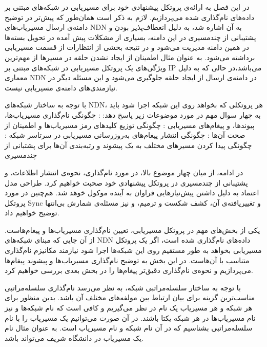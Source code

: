 

در این فصل به ارائه‌ی پروتکل پیشنهادی خود برای مسیریابی در شبکه‌های مبتنی بر داده‌های نام‌گذاری شده می‌پردازیم. لازم به ذکر است همان‌طور که پیش‌تر در توضیح دامنه‌ی ارسال مسیریاب‌های NDN به آن اشاره شد، به دلیل انعطاف‌پذیر بودن و پشتیبانی از چندمسیری در این دامنه‌، بسیاری از مشکلات پیش آمده در تحویل بسته‌ها در همین دامنه مدیریت می‌شود و در نتیجه بخشی از انتظارات از قسمت مسیریابی برداشته می‌شود. به عنوان مثال اطمینان از ایجاد نشدن حلقه در مسیرها از مهم‌ترین ویژگی‌های یک پروتکل مسیریابی در شبکه‌های مبتنی بر IP می‌باشد،در حالی که به دلیل معماری NDN در دامنه‌ی ارسال از ایجاد حلقه جلوگیری می‌شود و این مسئله دیگر در نیازمندی‌های دامنه‌ی مسیریابی نیست. 

 با توجه به ساختار شبکه‌های NDN، هر پروتکلی که بخواهد روی این شبکه اجرا شود باید به چهار سوال مهم در مورد موضوعات زیر پاسخ دهد:
 : چگونگی نام‌گذاری مسیریاب‌ها، پیوند‌ها، و پیغام‌های مسیریابی
 : چگونگی توزیع کلید‌های رمز مسیریاب‌ها و اطمینان از صحت آن‌ها
 : چگونگی انتشار پیغام‌های به‌روزرسانی مسیریابی در سرتاسر شبکه
 : چگونگی پیدا کردن مسیرهای مختلف به یک پیشوند و رتبه‌بندی آن‌ها برای پشتبانی از چندمسیری

در ادامه، از میان چهار موضوع بالا، در مورد نام‌گذاری، نحوه‌ی انتشار اطلاعات، و پشتیبانی از چندمسیری در پروتکل پیشنهادی خود صحبت خواهیم کرد. طراحی مدل اعتماد به دلیل داشتن  پیش‌نیازهایی فراوان به آینده موکول خوهد شد. هم‌چنین در مورد پروتکل Sync و تغییریافته‌ی آن، کشف شکست و ترمیم، و نیز مسئله‌ی شمارش بی‌انتها توضیح خواهیم داد.


یکی از بخش‌های مهم در پروتکل مسیریابی، تعیین نام‌گذاری مسیریاب‌ها و پیغام‌هاست. از آن جایی که مبنای شبکه‌های NDN داده‌های نام‌گذاری شده است، اگر یک پروتکل مسیریابی بخواهد به طور مستقیم روی این شبکه‌ها اجرا شود نیازمند مکانیزم نام‌گذاری متناسب با آن‌هاست. در این بخش به توضیح نام‌گذاری مسیریاب‌ها و پیشوند پیغام‌ها می‌پردازیم و نحوه‌ی نام‌گذاری دقیق‌تر پیغام‌ها را در بخش بعدی بررسی خواهیم کرد. 

با توجه به ساختار سلسله‌مراتبی شبکه، به نظر می‌رسد نام‌گذاری سلسله‌مراتبی مناسب‌ترین گزینه برای بیان ارتباط بین مولفه‌های مختلف آن باشد. بدین منظور برای هر شبکه و هر مسیریاب یک نام در نظر می‌گیریم و کافی است که نام شبکه‌ها و نیز نام مسیریاب‌ها در هر شبکه یکتا باشند. در آن صورت می‌توانیم یک مسیریاب را با نام سلسله‌مراتبی  بشناسیم که در آن  نام شبکه و  نام مسیریاب است. به عنوان مثال نام یک مسیریاب در دانشگاه شریف می‌تواند  باشد. 

